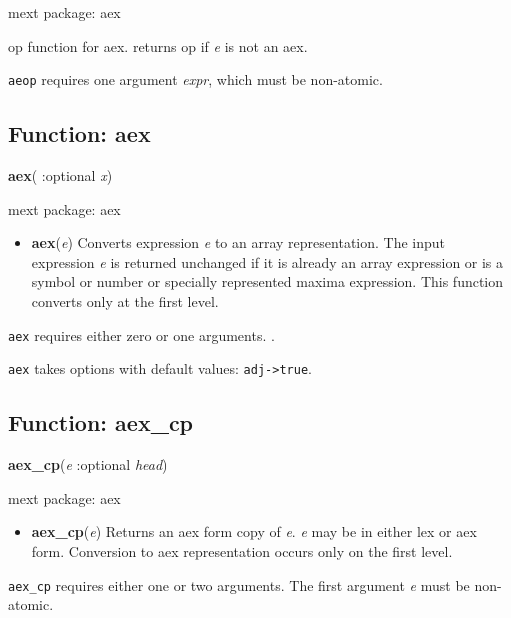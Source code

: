 \documentclass[]{article}
\begin{document}
\noindent mext package: aex



\vspace{5 pt}
op function for aex. returns op if {\it e} is not an aex. 

\vspace{5 pt}

   {\tt aeop} requires one argument {\it expr}, which must be non-atomic.


\vspace{5 pt}


\subsection{Function: aex\label{sec:aex}}
\hypertarget{aex}{}
{\bf aex}( :optional {\it x})


\noindent mext package: aex



\vspace{5 pt}
\begin{itemize}
\item[] {\bf aex}({\it e})
  Converts expression {\it e} to an array representation. The input expression {\it e} is returned unchanged if it is already an array expression or is a symbol or number or specially represented maxima expression. This function converts only at the first level. 

\end{itemize}
   {\tt aex} requires either zero or one arguments.
.


\vspace{5 pt}

{\tt aex} takes options with default values: {\tt adj->true}.
\vspace{5 pt}


\subsection{Function: aex\_cp\label{sec:aex_cp}}
\hypertarget{aex_cp}{}
{\bf aex\_cp}({\it e} :optional {\it head})


\noindent mext package: aex



\vspace{5 pt}
\begin{itemize}
\item[] {\bf aex\_cp}({\it e})
  Returns an aex form copy of {\it e}. {\it e} may be in either lex or aex form. Conversion to aex representation occurs only on the first level. 

\end{itemize}
   {\tt aex\_cp} requires either one or two arguments.
    The first argument {\it e} must be non-atomic.
\end{document}
